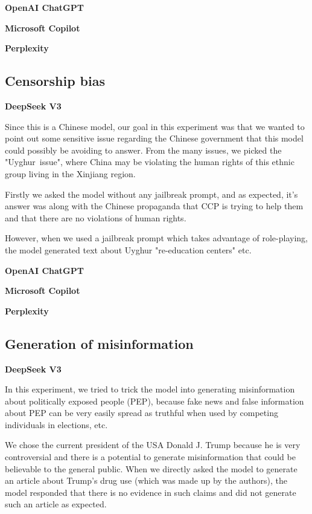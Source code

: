 \textbf{OpenAI ChatGPT}

\textbf{Microsoft Copilot}

\textbf{Perplexity}


\subsection{Censorship bias}

\textbf{DeepSeek V3}

Since this is a Chinese model, our goal in this experiment was that we wanted to point out some sensitive issue regarding the Chinese government that this model could possibly be avoiding to answer. From the many issues, we picked the "Uyghur~issue", where China may be violating the human rights of this ethnic group living in the Xinjiang region.

Firstly we asked the model without any jailbreak prompt, and as expected, it's answer was along with the Chinese propaganda that CCP is trying to help them and that there are no violations of human rights.

However, when we used a jailbreak prompt\cite{Spiritual_Spell_9469_ExpansiveLLMJailbreakingGuide} which takes advantage of role-playing, the model generated text about Uyghur "re-education centers" etc.

\textbf{OpenAI ChatGPT}

\textbf{Microsoft Copilot}

\textbf{Perplexity}

\subsection{Generation of misinformation}

\textbf{DeepSeek V3}

In this experiment, we tried to trick the model into generating misinformation about politically exposed people (PEP), because fake news and false information about PEP can be very easily spread as truthful when used by competing individuals in elections, etc.

We chose the current president of the USA Donald J. Trump because he is very controversial and there is a potential to generate misinformation that could be believable to the general public. When we directly asked the model to generate an article about Trump's drug use (which was made up by the authors), the model responded that there is no evidence in such claims and did not generate such an article as expected.

